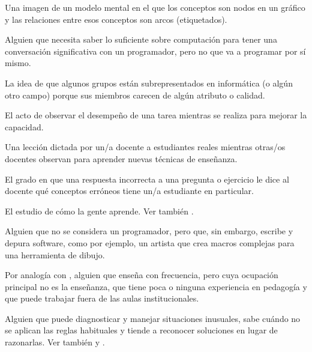\begin{description}
 Una imagen de un modelo mental en el que 
los conceptos son nodos en un gráfico y las relaciones entre esos conceptos son arcos (etiquetados).


 Alguien que necesita saber
lo suficiente sobre computación para tener una conversación significativa con un programador, 
pero no que va a programar por sí mismo.




 La idea de que algunos grupos 
están subrepresentados en informática (o algún otro campo) porque sus miembros 
carecen de algún atributo o calidad.

 El acto de observar el desempeño 
de una tarea mientras se realiza para mejorar la capacidad.

 Una lección dictada por un/a docente a estudiantes reales 
mientras otras/os docentes observan para aprender nuevas técnicas de enseñanza.

 El grado en que una respuesta incorrecta 
a una pregunta o ejercicio le dice al docente qué conceptos erróneos tiene un/a estudiante en particular.





 El estudio de cómo
la gente aprende. Ver también .




 Alguien que no se considera 
un programador, pero que, sin embargo, escribe y depura software, como por ejemplo, un artista que 
crea macros complejas para una herramienta de dibujo.

 Por analogía con
,
alguien que enseña con frecuencia, pero cuya ocupación principal no es la enseñanza, 
que tiene poca o ninguna experiencia en pedagogía y que puede trabajar fuera de las aulas institucionales.

 Alguien que puede diagnosticar y manejar situaciones inusuales, 
sabe cuándo no se aplican las reglas habituales y tiende a reconocer soluciones en lugar de razonarlas. 
Ver también 
y .


\end{description}
